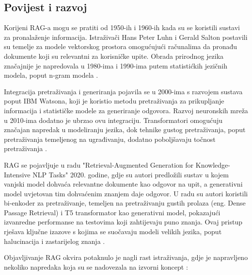 \documentclass[]{foi}
\begin{document}
\subsection{Povijest i razvoj}

Korijeni RAG-a mogu se pratiti od 1950-ih i 1960-ih kada su se koristili sustavi za pronalaženje informacija. Istraživači Hans Peter Luhn i Gerald Salton postavili su temelje za modele
vektorskog prostora omogućujući računalima da pronađu dokumente koji su relevantni za korisničke upite. Obrada prirodnog jezika značajnije je napredovala u 1980-ima i 1990-ima putem
statistićkih jezičnih modela, poput n-gram modela \cite{custom_ai_studio2025}. 

Integracija pretraživanja i generiranja pojavila se u 2000-ima s razvojem sustava poput IBM Watsona, koji je koristio metodu pretraživanja za prikupljanje informacija i statističke modele 
za generiranje odgovora. Razvoj neuronskih mreža u 2010-ima dodatno je ubrzao ovu integraciju. Transformatori omogućuju značajan napredak u modeliranju jezika, dok tehnike gustog pretraživanja,
poput pretraživanja temeljenog na ugrađivanju, dodatno poboljšavaju točnost pretraživanja \cite{custom_ai_studio2025}. 

RAG se pojavljuje u radu "Retrieval-Augmented Generation for Knowledge-Intensive NLP Tasks" 2020. godine, gdje su autori predložili sustav u kojem vanjski model dohvaća relevantne
dokumente kao odgovor na upit, a generativni model uvjetovan tim dohvaćenim znanjem daje odgovor. U radu su autori koristili bi-enkoder za pretraživanje, temeljen na pretraživanju gustih prolaza
(eng. Dense Passage Retrieval) i T5 transformator kao generativni model, pokazajući izvanredne performanse na testovima koji zahtijevaju puno znanja. 
Ovaj pristup rješava ključne izazove s kojima se suočavaju modeli velikih jezika, poput halucinacija i zastarijelog znanja \cite{custom_ai_studio2025}. 

Objavljivanje RAG okvira potaknulo je nagli rast istraživanja, gdje je napravljeno nekoliko napredaka koja su se nadovezala na izvorni koncept \cite{custom_ai_studio2025}:
\end{document}
